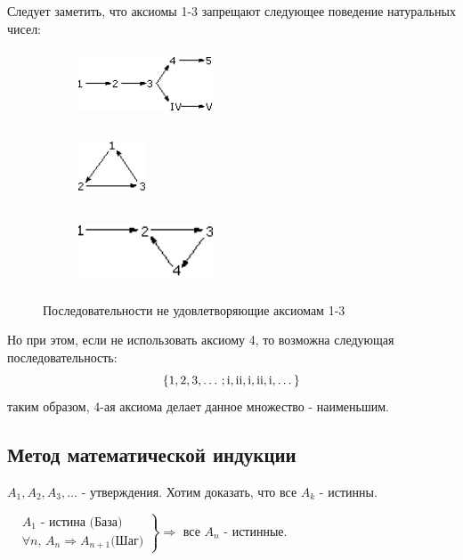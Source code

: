 \documentclass[12pt]{article}
\newcommand{\RN}[1]{%
	\textup{\uppercase\expandafter{\romannumeral#1}}%
}
\theoremstyle{definition}
\begin{document}
Следует заметить, что аксиомы 1-3 запрещают следующее поведение натуральных чисел:
\begin{figure}[H]
	\centering
	\begin{subfigure}[b]{0.33\textwidth}
		\centering
		\includegraphics[width=4cm, height = 2cm]{1_1}
		\label{fig:1_1}
	\end{subfigure}
	\begin{subfigure}[b]{0.32\textwidth}
		\centering
		\includegraphics[width=2cm, height = 2cm]{1_2}
		\label{fig:1_2}
	\end{subfigure}
	\begin{subfigure}[b]{0.33\textwidth}
		\centering
		\includegraphics[width=4cm, height = 2cm]{1_3}
		\label{fig:1_3}
	\end{subfigure}	
	\caption{Последовательности не удовлетворяющие аксиомам 1-3}
	\label{fig:Сюръективность}
\end{figure}

Но при этом, если не использовать аксиому 4, то возможна следующая последовательность: $$\{1, 2, 3, \dotsc; \RN{1}, \RN{2}, \RN{1}, \RN{2}, \RN{1}, \dotsc\}$$
таким образом, 4-ая аксиома делает данное множество - наименьшим.

\subsection*{Метод математической индукции}

$A_1, A_2, A_3, \dotsc$ - утверждения. Хотим доказать, что все $A_k$ - истинны.

$\left.\begin{aligned}
&	A_1 \text{ - истина  (База)}\\
&	\forall n,\, A_n \Rightarrow A_{n+1} \text{(Шаг)}   
\end{aligned}
\right\}
\Rightarrow \text{ все } A_n \text{ - истинные}$.
\end{document}
